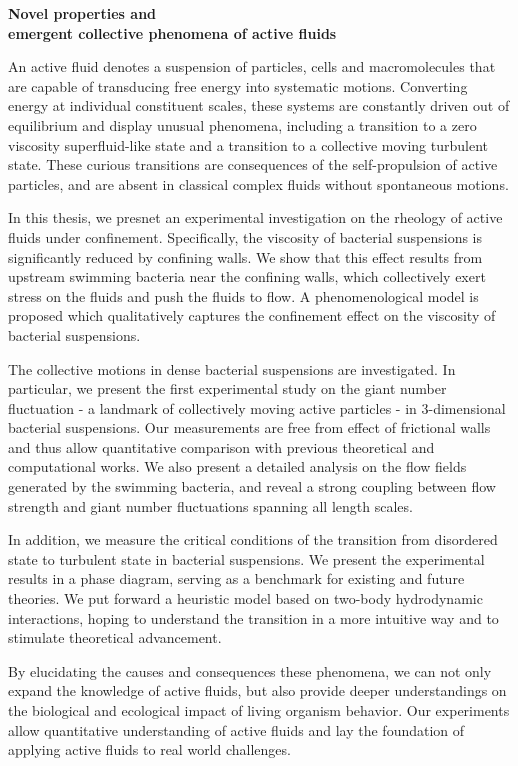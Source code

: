 \documentclass[11pt]{article}
\begin{document}
\begin{center}
  \large {}\selectfont
\textbf{Novel properties and \\ emergent collective phenomena of active fluids}
\end{center}


An active fluid denotes a suspension of particles, cells and macromolecules that are capable of transducing free energy into systematic motions. Converting energy at individual constituent scales, these systems are constantly driven out of equilibrium and display unusual phenomena, including a transition to a zero viscosity superfluid-like state and a transition to a collective moving turbulent state. These curious transitions are consequences of the self-propulsion of active particles, and are absent in classical complex fluids without spontaneous motions.

In this thesis, we presnet an experimental investigation on the rheology of active fluids under confinement. Specifically, the viscosity of bacterial suspensions is significantly reduced by confining walls. We show that this effect results from upstream swimming bacteria near the confining walls, which collectively exert stress on the fluids and push the fluids to flow. A phenomenological model is proposed which qualitatively captures the confinement effect on the viscosity of bacterial suspensions.

The collective motions in dense bacterial suspensions are investigated. In particular, we present the first experimental study on the giant number fluctuation - a landmark of collectively moving active particles - in 3-dimensional bacterial suspensions. Our measurements are free from effect of frictional walls and thus allow quantitative comparison with previous theoretical and computational works. We also present a detailed analysis on the flow fields generated by the swimming bacteria, and reveal a strong coupling between flow strength and giant number fluctuations spanning all length scales.

In addition, we measure the critical conditions of the transition from disordered state to turbulent state in bacterial suspensions. We present the experimental results in a phase diagram, serving as a benchmark for existing and future theories. We put forward a heuristic model based on two-body hydrodynamic interactions, hoping to understand the transition in a more intuitive way and to stimulate theoretical advancement.

By elucidating the causes and consequences these phenomena, we can not only expand the knowledge of active fluids, but also provide deeper understandings on the biological and ecological impact of living organism behavior. Our experiments allow quantitative understanding of active fluids and lay the foundation of applying active fluids to real world challenges.
\end{document}
